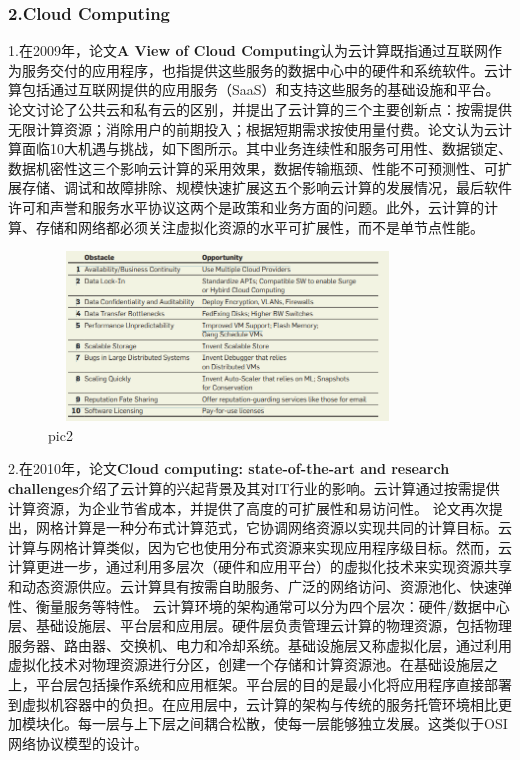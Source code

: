 \documentclass[a4paper,twoside]{scrbook}
\begin{document}
\subsubsection{2.Cloud Computing}
1.在2009年，论文\textbf{A View of Cloud Computing}认为云计算既指通过互联网作为服务交付的应用程序，也指提供这些服务的数据中心中的硬件和系统软件。云计算包括通过互联网提供的应用服务（SaaS）和支持这些服务的基础设施和平台。论文讨论了公共云和私有云的区别，并提出了云计算的三个主要创新点：按需提供无限计算资源；消除用户的前期投入；根据短期需求按使用量付费。论文认为云计算面临10大机遇与挑战，如下图所示。其中业务连续性和服务可用性、数据锁定、数据机密性这三个影响云计算的采用效果，数据传输瓶颈、性能不可预测性、可扩展存储、调试和故障排除、规模快速扩展这五个影响云计算的发展情况，最后软件许可和声誉和服务水平协议这两个是政策和业务方面的问题。此外，云计算的计算、存储和网络都必须关注虚拟化资源的水平可扩展性，而不是单节点性能。
\begin{figure}
\centering %
\includegraphics[height=4.5cm,width=9.5cm]{cloud10.png}
\caption{pic2}
\end{figure}

2.在2010年，论文\textbf{Cloud computing: state-of-the-art and research challenges}介绍了云计算的兴起背景及其对IT行业的影响。云计算通过按需提供计算资源，为企业节省成本，并提供了高度的可扩展性和易访问性。
论文再次提出，网格计算是一种分布式计算范式，它协调网络资源以实现共同的计算目标。云计算与网格计算类似，因为它也使用分布式资源来实现应用程序级目标。然而，云计算更进一步，通过利用多层次（硬件和应用平台）的虚拟化技术来实现资源共享和动态资源供应。云计算具有按需自助服务、广泛的网络访问、资源池化、快速弹性、衡量服务等特性。
云计算环境的架构通常可以分为四个层次：硬件/数据中心层、基础设施层、平台层和应用层。硬件层负责管理云计算的物理资源，包括物理服务器、路由器、交换机、电力和冷却系统。基础设施层又称虚拟化层，通过利用虚拟化技术对物理资源进行分区，创建一个存储和计算资源池。在基础设施层之上，平台层包括操作系统和应用框架。平台层的目的是最小化将应用程序直接部署到虚拟机容器中的负担。在应用层中，云计算的架构与传统的服务托管环境相比更加模块化。每一层与上下层之间耦合松散，使每一层能够独立发展。这类似于OSI 网络协议模型的设计。
\end{document}
